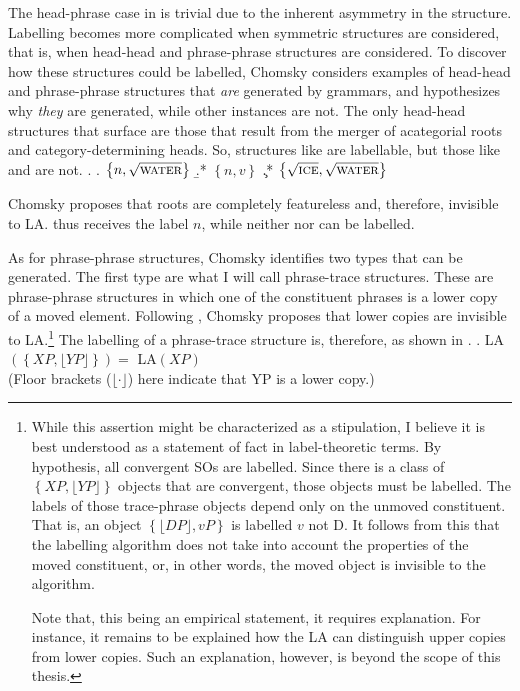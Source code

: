 \documentclass[MilwayThesis]{subfiles}
\begin{document}
The head-phrase case in \Last is trivial due to the inherent asymmetry in the structure.
Labelling becomes more complicated when symmetric structures are considered, that is, when head-head and phrase-phrase structures are considered.
To discover how these structures could be labelled, Chomsky considers examples of head-head and phrase-phrase structures that \textit{are} generated by grammars, and hypothesizes why \textit{they} are generated, while other instances are not.
The only head-head structures that surface are those that result from the merger of acategorial roots and category-determining heads.
So, structures like \Next[a] are labellable, but those like \Next[b] and \Next[c] are not.
\ex.
\a. $\left\{ n, \sqrt{\textsc{water}}\right\}$
\b.* $\left\{ n, v\right\}$
\c.* $\left\{ \sqrt{\textsc{ice}}, \sqrt{\textsc{water}} \right\}$

Chomsky proposes that roots are completely featureless and, therefore, invisible to LA.
\Last[a] thus receives the label $n$, while neither \Last[b] nor \Last[c] can be labelled.

As for phrase-phrase structures, Chomsky identifies two types that can be generated.
The first type are what I will call phrase-trace structures.
These are phrase-phrase structures in which one of the constituent phrases is a lower copy of a moved element.
Following \textcite{moro2000dynamic}, Chomsky proposes that lower copies are invisible to LA.\footnote{
	While this assertion might be characterized as a stipulation, I believe it is best understood as a statement of fact in label-theoretic terms.
	By hypothesis, all convergent SOs are labelled.
	Since there is a class of $\left\{XP, \lfloor YP\rfloor \right\}$ objects that are convergent, those objects must be labelled.
	The labels of those trace-phrase objects depend only on the unmoved constituent.
	That is, an object $\left\{ \lfloor DP\rfloor, vP \right\}$ is labelled $v$ not D.
	It follows from this that the labelling algorithm does not take into account the properties of the moved constituent, or, in other words, the moved object is invisible to the algorithm.

	Note that, this being an empirical statement, it requires explanation.
	For instance, it remains to be explained how the LA can distinguish upper copies from lower copies.
	Such an explanation, however, is beyond the scope of this thesis.
}
The labelling of a phrase-trace structure is, therefore, as shown in \Next.
\ex. LA$(\left\{ XP, \lfloor YP\rfloor \right\}) =$ LA$(XP)$\\
(Floor brackets ($\lfloor\cdot\rfloor$) here indicate that YP is a lower copy.)
\end{document}
